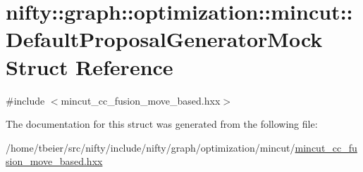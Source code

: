 \hypertarget{structnifty_1_1graph_1_1optimization_1_1mincut_1_1DefaultProposalGeneratorMock}{}\section{nifty\+:\+:graph\+:\+:optimization\+:\+:mincut\+:\+:Default\+Proposal\+Generator\+Mock Struct Reference}
\label{structnifty_1_1graph_1_1optimization_1_1mincut_1_1DefaultProposalGeneratorMock}


{\ttfamily \#include $<$mincut\+\_\+cc\+\_\+fusion\+\_\+move\+\_\+based.\+hxx$>$}



The documentation for this struct was generated from the following file\+:\begin{DoxyCompactItemize}
\item 
/home/tbeier/src/nifty/include/nifty/graph/optimization/mincut/\hyperlink{mincut__cc__fusion__move__based_8hxx}{mincut\+\_\+cc\+\_\+fusion\+\_\+move\+\_\+based.\+hxx}\end{DoxyCompactItemize}
